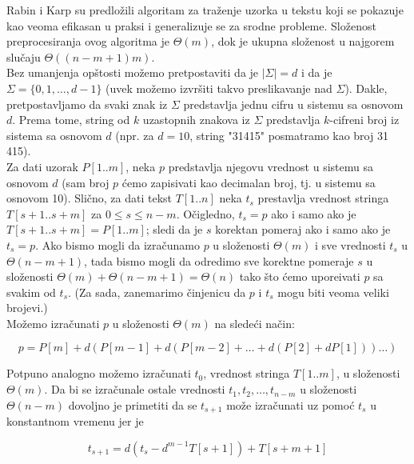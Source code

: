 \documentclass[a4paper,12pt]{article}
\begin{document}
Rabin i Karp su predlo\v zili algoritam za tra\v zenje uzorka u tekstu koji se pokazuje kao veoma efikasan u praksi i generalizuje se za srodne probleme. Slo\v zenost preprocesiranja ovog algoritma je $\Theta(m)$, dok je ukupna slo\v zenost u najgorem slu\v caju $\Theta((n - m + 1)m)$.
\\

Bez umanjenja op\v stosti mo\v zemo pretpostaviti da je $|\Sigma| = d$ i da je $\Sigma = \{ 0, 1, \ldots, d - 1 \}$ (uvek mo\v zemo izvr\v siti takvo preslikavanje nad $\Sigma$). Dakle, pretpostavljamo da svaki znak iz $\Sigma$ predstavlja jednu cifru u sistemu sa osnovom $d$. Prema tome, string od $k$ uzastopnih znakova iz $\Sigma$ predstavlja $k$-cifreni broj iz sistema sa osnovom $d$ (npr. za $d = 10$, string "31415" posmatramo kao broj 31 415).
\\

Za dati uzorak $P[1..m]$, neka $p$ predstavlja njegovu vrednost u sistemu sa osnovom $d$ (sam broj $p$ \' cemo zapisivati kao decimalan broj, tj. u sistemu sa osnovom 10). Sli\v cno, za dati tekst $T[1..n]$ neka $t_s$ prestavlja vrednost stringa $T[s + 1..s + m]$ za $0 \leq s \leq n - m$. O\v cigledno, $t_s = p$ ako i samo ako je $T[s + 1..s + m] = P[1..m]$; sledi da je $s$ korektan pomeraj ako i samo ako je $t_s = p$. Ako bismo mogli da izra\v cunamo $p$ u slo\v zenosti $\Theta(m)$ i sve vrednosti $t_s$ u $\Theta(n - m + 1)$, tada bismo mogli da odredimo sve korektne pomeraje $s$ u slo\v zenosti $\Theta(m) + \Theta(n - m + 1) = \Theta(n)$ tako \v sto \' cemo upore\dj ivati $p$ sa svakim od $t_s$. (Za sada, zanemarimo \v cinjenicu da $p$ i $t_s$ mogu biti veoma veliki brojevi.)
\\

Mo\v zemo izra\v cunati $p$ u slo\v zenosti $\Theta(m)$ na slede\' ci na\v cin:

\begin{equation}
p = P[m] + d(P[m - 1] + d(P[m - 2] + \ldots + d(P[2] + dP[1])) \ldots )
\end{equation}

Potpuno analogno mo\v zemo izra\v cunati $t_0$, vrednost stringa $T[1..m]$, u slo\v zenosti $\Theta(m)$. Da bi se izra\v cunale ostale vrednosti $t_1, t_2, \ldots, t_{n - m}$ u slo\v zenosti $\Theta(n - m)$ dovoljno je primetiti da se $t_{s+1}$ mo\v ze izra\v cunati uz pomo\' c $t_s$ u konstantnom vremenu jer je

\begin{equation}
t_{s + 1} = d(t_s - d^{m - 1}T[s + 1]) + T[s + m + 1]
\end{equation}
\end{document}
